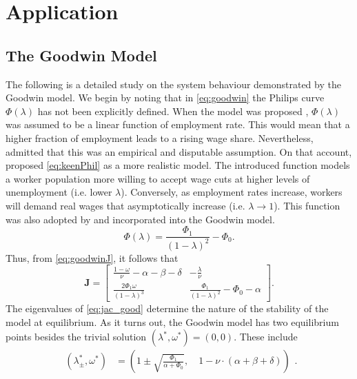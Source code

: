 \documentclass[12pt, centerh1]{article}
\begin{document}
\section{Application}

\subsection{The Goodwin Model}
The following is a detailed study on the system behaviour demonstrated by the Goodwin model. We begin by noting that in \eqref{eq:goodwin} the Philips curve $\Phi(\lambda)$ has not been explicitly defined. When the model was proposed \citep{goodwin1982growth}, $\Phi(\lambda)$ was assumed to be a linear function of employment rate. This would mean that a higher fraction of employment leads to a rising wage share. Nevertheless, \citet{goodwin1982growth} admitted that this was an empirical and disputable assumption. On that account, \citet{keen1995finance} proposed \eqref{eq:keenPhil} as a more realistic model. The introduced function models a worker population more willing to accept wage cuts at higher levels of unemployment (i.e. lower $\lambda$). Conversely, as employment rates increase, workers will demand real wages that asymptotically increase (i.e. $\lambda\to1$). This function was also adopted by \citet{grasselli2012analysis} and incorporated into the Goodwin model.
\begin{equation} \label{eq:keenPhil}
    \Phi(\lambda) = \frac{\Phi_1}{(1-\lambda)^2}-\Phi_0.
\end{equation}
Thus, from \eqref{eq:goodwinJ}, it follows that
\begin{equation} \label{eq:jac_good}
    \mathbf J = \begin{bmatrix}
        \frac{1-\omega}{\nu}-\alpha-\beta-\delta & -\frac{\lambda}{\nu}\\[1ex]
        \frac{2\Phi_1\omega}{(1-\lambda)^3} & \frac{\Phi_1}{(1-\lambda)^2}-\Phi_0-\alpha
\end{bmatrix}.
\end{equation}
The eigenvalues of \eqref{eq:jac_good} determine the nature of the stability of the model at equilibrium. As it turns out, the Goodwin model has two equilibrium points besides the trivial solution $(\lambda^\ast,\omega^\ast)=(0, 0)$. These include
\begin{equation} \label{eq:goodwin_eqm}
\begin{split}
    (\lambda_\pm^\ast, \omega^\ast) &= \left(1\pm\sqrt{\frac{\Phi_1}{\alpha + \Phi_0}},\quad  1-\nu\cdot(\alpha + \beta + \delta)\right)
\end{split}.
\end{equation}
\end{document}
